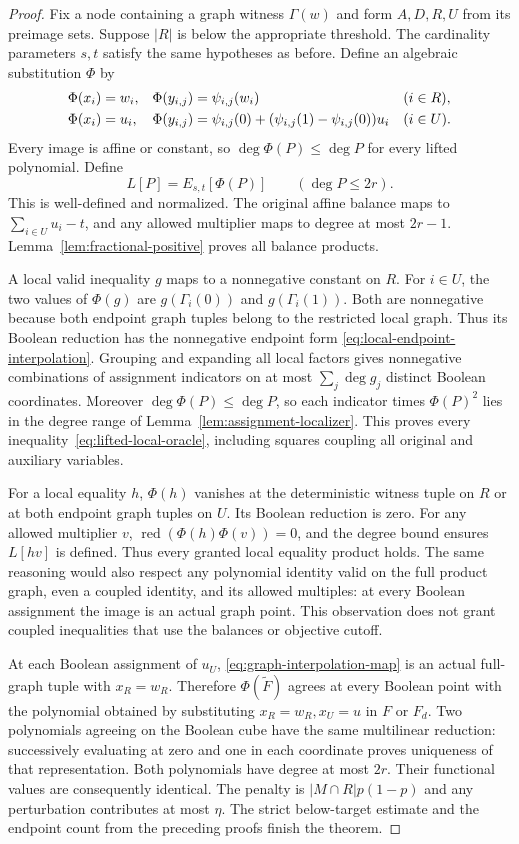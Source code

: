 \begin{proof}
Fix a node containing a graph witness $\Gamma(w)$ and form $A,D,R,U$
from its preimage sets. Suppose $|R|$ is below the appropriate threshold.
The cardinality parameters $s,t$ satisfy the same hypotheses as before.
Define an algebraic substitution $\Phi$ by
\begin{align}
 \Phi(x_i)&=w_i,&
 \Phi(y_{i,j})&=\psi_{i,j}(w_i) &&(i\in R),\notag\\
 \Phi(x_i)&=u_i,&
 \Phi(y_{i,j})&=\psi_{i,j}(0)
       +(\psi_{i,j}(1)-\psi_{i,j}(0))u_i &&(i\in U).
 \label{eq:graph-interpolation-map}
\end{align}
Every image is affine or constant, so
$\deg\Phi(P)\le\deg P$ for every lifted polynomial. Define
\[
 L[P]=E_{s,t}[\Phi(P)]\qquad(\deg P\le2r).
\]
This is well-defined and normalized. The original affine balance maps
to $\sum_{i\in U}u_i-t$, and any allowed multiplier maps to degree at
most $2r-1$. Lemma~\ref{lem:fractional-positive} proves all balance
products.

A local valid inequality $g$ maps to a nonnegative constant on $R$.
For $i\in U$, the two values of $\Phi(g)$ are
$g(\Gamma_i(0))$ and $g(\Gamma_i(1))$. Both are nonnegative because
both endpoint graph tuples belong to the restricted local graph.
Thus its Boolean reduction has the nonnegative endpoint form
\eqref{eq:local-endpoint-interpolation}. Grouping and expanding all
local factors gives nonnegative combinations of assignment indicators
on at most $\sum_j\deg g_j$ distinct Boolean coordinates. Moreover
$\deg\Phi(P)\le\deg P$, so each indicator times $\Phi(P)^2$ lies
in the degree range of Lemma~\ref{lem:assignment-localizer}.
This proves every inequality~\eqref{eq:lifted-local-oracle}, including
squares coupling all original and auxiliary variables.

For a local equality $h$, $\Phi(h)$ vanishes at the deterministic
witness tuple on $R$ or at both endpoint graph tuples on $U$. Its
Boolean reduction is zero. For any allowed multiplier $v$,
$\operatorname{red}(\Phi(h)\Phi(v))=0$, and the degree bound ensures
$L[hv]$ is defined. Thus every granted local equality product holds.
The same reasoning would also respect any polynomial identity valid on
the full product graph, even a coupled identity, and its allowed
multiples: at every Boolean assignment the image is an actual graph
point. This observation does not grant coupled inequalities that use
the balances or objective cutoff.

At each Boolean assignment of $u_U$, \eqref{eq:graph-interpolation-map}
is an actual full-graph tuple with $x_R=w_R$. Therefore
$\Phi(\widetilde F)$ agrees at every Boolean point with the polynomial
obtained by substituting $x_R=w_R,x_U=u$ in $F$ or $F_d$. Two
polynomials agreeing on the Boolean cube have the same multilinear
reduction: successively evaluating at zero and one in each coordinate
proves uniqueness of that representation. Both polynomials have degree
at most $2r$. Their functional values are consequently identical.
The penalty is $|M\cap R|p(1-p)$ and any perturbation contributes at
most $\eta$. The strict below-target estimate and the endpoint count
from the preceding proofs finish the theorem.
\end{proof}

